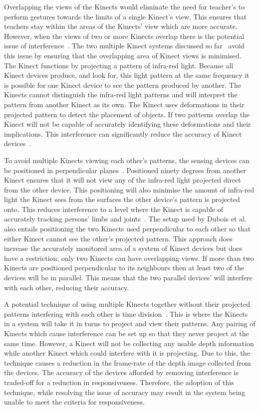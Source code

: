 \documentclass[manuscript, review, screen]{acmart}
\begin{document}
Overlapping the views of the Kinects would eliminate the need for teacher's to perform gestures towards the limits of a single Kinect's view.
This ensures that teachers stay within the areas of the Kinects' view which are more accurate.
However, when the views of two or more Kinects overlap there is the potential issue of interference~\cite{Satyavolu2012}.
The two multiple Kinect systems discussed so far~\cite{Dubois2011,Luber2011} avoid this issue by ensuring that the overlapping area of Kinect views is minimised.
The Kinect functions by projecting a pattern of infra-red light.
Because all Kinect devices produce, and look for, this light pattern at the same frequency it is possible for one Kinect device to see the pattern produced by another.
The Kinects cannot distinguish the infra-red light patterns and will interpret the pattern from another Kinect as its own.
The Kinect uses deformations in their projected pattern to detect the placement of objects.
If two patterns overlap the Kinect will not be capable of accurately identifying these deformations and their implications.
This interference can significantly reduce the accuracy of Kinect devices~\cite{Satyavolu2012}.

To avoid multiple Kinects viewing each other's patterns, the sensing devices can be positioned in perpendicular planes~\cite{Caon2011,Kramer2012}.
Positioned ninety degrees from another Kinect ensures that it will not view any of the infra-red light projected direct from the other device.
This positioning will also minimise the amount of infra-red light the Kinect sees from the surfaces the other device's pattern is projected onto.
This reduces interference to a level where the Kinect is capable of accurately tracking persons' limbs and joints~\cite{Caon2011}.
The setup used by Dubois et al.~\cite{Dubois2011} also entails positioning the two Kinects used perpendicular to each other so that either Kinect cannot see the other's projected pattern.
This approach does increase the accurately monitored area of a system of Kinect devices but does have a restriction; only two Kinects can have overlapping views.
If more than two Kinects are positioned perpendicular to its neighbours then at least two of the devices will be in parallel.
This means that the two parallel devices' will interfere with each other, reducing their accuracy.

A potential technique of using multiple Kinects together without their projected patterns interfering with each other is time division~\cite{Schroder2011}.
This is where the Kinects in a system will take it in turns to project and view their patterns.
Any pairing of Kinects which cause interference can be set up so that they never project at the same time.
However, a Kinect will not be collecting any usable depth information while another Kinect which could interfere with it is projecting.
Due to this,  the technique causes a reduction in the frame-rate of the depth image collected from the devices.
The accuracy of the devices afforded by removing interference is traded-off for a reduction in responsiveness.
Therefore, the adoption of this technique, while resolving the issue of accuracy may result in the system being unable to meet the criteria for responsiveness.
\end{document}
